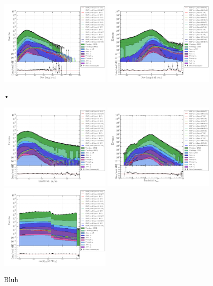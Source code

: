 \begin{figure}
\centering
\includegraphics[width=0.49\textwidth]{chapter8/img/1D_stack_newlength_150.png}
\includegraphics[width=0.49\textwidth]{chapter8/img/1D_stack_newlength_all_z.png}
\caption{•}
\label{fig:newvariables2}
\end{figure}

\begin{figure}
\centering
\includegraphics[width=0.49\textwidth]{chapter8/img/1D_stack_linefitvelocity}
\includegraphics[width=0.49\textwidth]{chapter8/img/1D_stack_sigma_corr_paraboloid}
\includegraphics[width=0.49\textwidth]{chapter8/img/1D_stack_spefit1_hc_coszenith}
\caption{Blub}
\label{fig:remainingvariables}
\end{figure}

